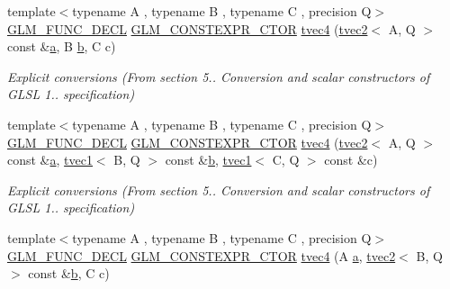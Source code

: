 \begin{DoxyCompactItemize}
\item 
{\footnotesize template$<$typename A , typename B , typename C , precision Q$>$ }\\\mbox{\hyperlink{setup_8hpp_ab2d052de21a70539923e9bcbf6e83a51}{G\+L\+M\+\_\+\+F\+U\+N\+C\+\_\+\+D\+E\+CL}} \mbox{\hyperlink{setup_8hpp_ad34178a09666081abdb573c14d1f4a5a}{G\+L\+M\+\_\+\+C\+O\+N\+S\+T\+E\+X\+P\+R\+\_\+\+C\+T\+OR}} \mbox{\hyperlink{structglm_1_1tvec4_a15815171ac69a67c7cc91fc45d67954a}{tvec4}} (\mbox{\hyperlink{structglm_1_1tvec2}{tvec2}}$<$ A, Q $>$ const \&\mbox{\hyperlink{glad_8h_ac8729153468b5dcf13f971b21d84d4e5}{a}}, B \mbox{\hyperlink{glad_8h_a6eba317e3cf44d6d26c04a5a8f197dcb}{b}}, C c)
\begin{DoxyCompactList}\small\item\em Explicit conversions (From section 5.. Conversion and scalar constructors of G\+L\+SL 1.. specification) \end{DoxyCompactList}\item 
{\footnotesize template$<$typename A , typename B , typename C , precision Q$>$ }\\\mbox{\hyperlink{setup_8hpp_ab2d052de21a70539923e9bcbf6e83a51}{G\+L\+M\+\_\+\+F\+U\+N\+C\+\_\+\+D\+E\+CL}} \mbox{\hyperlink{setup_8hpp_ad34178a09666081abdb573c14d1f4a5a}{G\+L\+M\+\_\+\+C\+O\+N\+S\+T\+E\+X\+P\+R\+\_\+\+C\+T\+OR}} \mbox{\hyperlink{structglm_1_1tvec4_a51f1f037c1b0ddc5cf7b610c6efda7f7}{tvec4}} (\mbox{\hyperlink{structglm_1_1tvec2}{tvec2}}$<$ A, Q $>$ const \&\mbox{\hyperlink{glad_8h_ac8729153468b5dcf13f971b21d84d4e5}{a}}, \mbox{\hyperlink{structglm_1_1tvec1}{tvec1}}$<$ B, Q $>$ const \&\mbox{\hyperlink{glad_8h_a6eba317e3cf44d6d26c04a5a8f197dcb}{b}}, \mbox{\hyperlink{structglm_1_1tvec1}{tvec1}}$<$ C, Q $>$ const \&c)
\begin{DoxyCompactList}\small\item\em Explicit conversions (From section 5.. Conversion and scalar constructors of G\+L\+SL 1.. specification) \end{DoxyCompactList}\item 
{\footnotesize template$<$typename A , typename B , typename C , precision Q$>$ }\\\mbox{\hyperlink{setup_8hpp_ab2d052de21a70539923e9bcbf6e83a51}{G\+L\+M\+\_\+\+F\+U\+N\+C\+\_\+\+D\+E\+CL}} \mbox{\hyperlink{setup_8hpp_ad34178a09666081abdb573c14d1f4a5a}{G\+L\+M\+\_\+\+C\+O\+N\+S\+T\+E\+X\+P\+R\+\_\+\+C\+T\+OR}} \mbox{\hyperlink{structglm_1_1tvec4_a9a93a56b36b84497626d62d7095e8180}{tvec4}} (A \mbox{\hyperlink{glad_8h_ac8729153468b5dcf13f971b21d84d4e5}{a}}, \mbox{\hyperlink{structglm_1_1tvec2}{tvec2}}$<$ B, Q $>$ const \&\mbox{\hyperlink{glad_8h_a6eba317e3cf44d6d26c04a5a8f197dcb}{b}}, C c)

\end{DoxyCompactItemize}
